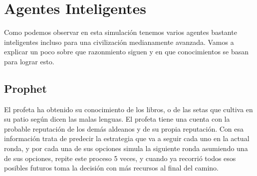 \documentclass{article}
\begin{document}
\section{Agentes Inteligentes}
Como podemos observar en esta simulaci\'on tenemos varios agentes bastante inteligentes incluso para una civilizaci\'on medianamente avanzada. Vamos a explicar
un poco sobre que razonmiento siguen y en que conocimientos se basan para lograr esto.

\subsection{Prophet}
El profeta ha obtenido su conocimiento de los libros, o de las setas que cultiva en su patio seg\'un dicen las malas lenguas. El profeta tiene una cuenta con la
probable reputaci\'on de los dem\'as aldeanos y de su propia reputaci\'on. Con esa informaci\'on trata de predecir la estrategia que va a seguir cada uno en la actual
ronda, y por cada una de sus opciones simula la siguiente ronda asumiendo una de sus opciones, repite este proceso 5 veces, y cuando ya recorri\'o todos esos posibles
futuros toma la decisi\'on con m\'as recursos al final del camino.
\end{document}
